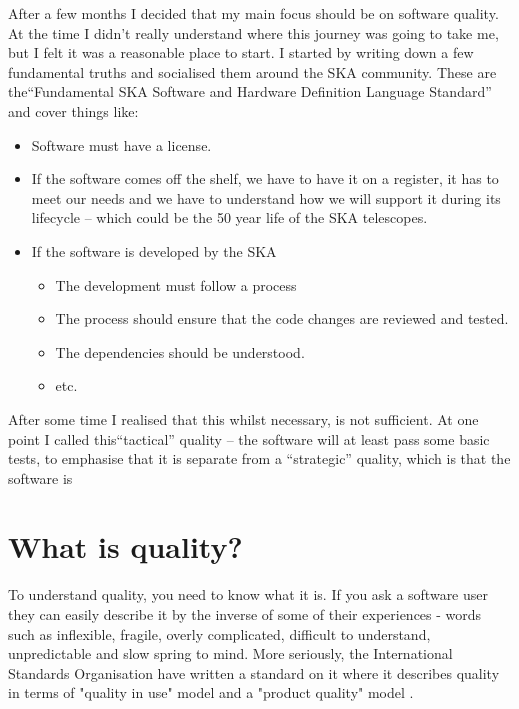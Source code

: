 \documentclass[11pt,twoside]{article}
\begin{document}
After a few months I decided that my main focus should be on software quality. At the time I didn't really understand where this journey was going to take me, but I felt it was a reasonable place to start. I started by writing down a few fundamental truths and socialised them around the SKA community. These are the``Fundamental SKA Software and Hardware Definition Language Standard'' and cover things like:
\begin{itemize}
\item Software must have a license.
\item If the software comes off the shelf, we have to have it on a register, it has to meet our needs and we have to understand how we will support it during its lifecycle -- which could be the 50 year life of the SKA telescopes.
\item If the software is developed by the SKA
\begin{itemize}
\item The development must follow a process
\item The process should ensure that the code changes are reviewed and tested.
\item The dependencies should be understood.
\item etc.
\end{itemize}
\end{itemize}

After some time I realised that this whilst necessary, is not sufficient. At one point I called this``tactical'' quality -- the software will at least pass some basic tests, to emphasise that it is separate from a ``strategic'' quality, which is that the software is 

\section{What is quality?}
To understand quality, you need to know what it is. If you ask a software user they can easily describe it by the inverse of some of their experiences - words such as inflexible, fragile, overly complicated, difficult to understand, unpredictable and slow spring to mind. More seriously, the International Standards Organisation have written a standard on it where it describes quality in terms of "quality in use" model and a "product quality" model \citep[See][]{iso25010}. 


\end{document}
